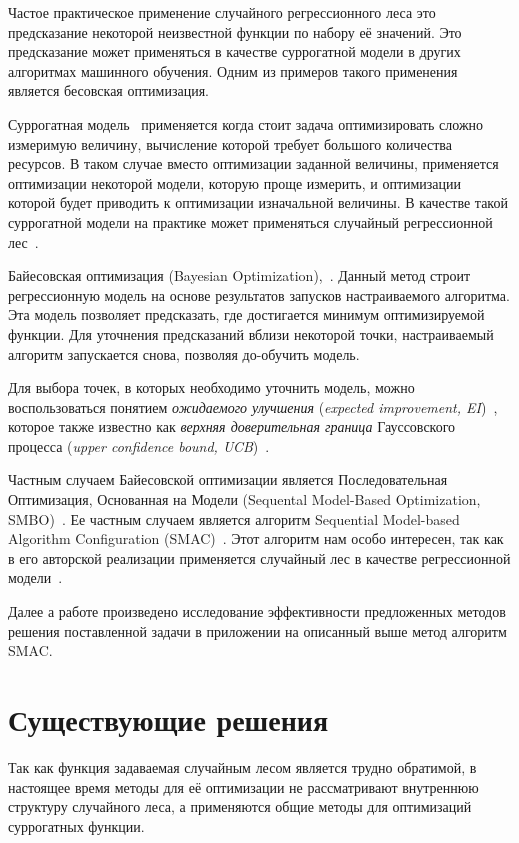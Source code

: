 Частое практическое применение случайного регрессионного леса это  предсказание
некоторой неизвестной функции по набору её значений. Это предсказание может
применяться в качестве суррогатной модели в других алгоритмах машинного
обучения. Одним из примеров такого применения является бесовская оптимизация.

Суррогатная модель~\cite{genasurr} применяется когда стоит задача оптимизировать
сложно измеримую величину, вычисление которой требует большого количества
ресурсов. В таком случае вместо оптимизации заданной величины, применяется
оптимизации некоторой модели, которую проще измерить, и оптимизации которой
будет приводить к оптимизации изначальной величины. В качестве такой суррогатной
модели на практике может применяться случайный регрессионной
лес~\cite{surrogate}.

Байесовская оптимизация (Bayesian Optimization),~\cite{bayes1}. Данный
метод строит регрессионную модель на основе результатов запусков настраиваемого
алгоритма. Эта модель позволяет предсказать, где достигается минимум
оптимизируемой функции. Для уточнения предсказаний вблизи некоторой точки,
настраиваемый алгоритм запускается снова, позволяя до-обучить модель.

Для выбора точек, в которых необходимо уточнить модель, можно воспользоваться
понятием \emph{ожидаемого улучшения} (\emph{expected improvement,
EI})~\cite{globalopt}, которое также известно как \emph{верхняя доверительная
граница} Гауссовского процесса (\emph{upper confidence bound,
UCB})~\cite{gaussbandit}.

Частным случаем Байесовской оптимизации является Последовательная Оптимизация,
Основанная на Модели (Sequental Model-Based Optimization, SMBO)~\cite{smac}. Ее
частным случаем является алгоритм Sequential Model-based Algorithm Configuration
(SMAC)~\cite{elf}. Этот алгоритм нам особо интересен, так как в его авторской
реализации применяется случайный лес в качестве регрессионной
модели~\cite{automl_smac_repo}.

Далее а работе произведено исследование эффективности предложенных методов
решения поставленной задачи в приложении на описанный выше метод алгоритм
SMAC\@.

\section{Существующие решения}\label{sec:solutions}

Так как функция задаваемая случайным лесом является трудно обратимой,
в настоящее время методы для её оптимизации не рассматривают внутреннюю
структуру случайного леса, а применяются общие методы для оптимизаций суррогатных
функции.

